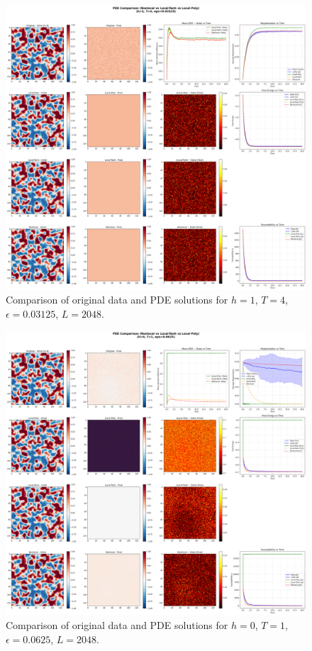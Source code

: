 \documentclass[11pt,a4paper]{article}
\begin{document}
\begin{figure}[h]
    \centering
    \includegraphics[width=1.0\textwidth]{fig/compare_pde_solvers_L2048_h1_T4_eps0.03125.png}
    \caption{Comparison of original data and PDE solutions for $h=1$, $T=4$, $\epsilon=0.03125$, $L=2048$.}
    \label{fig:pde_comparison_h1_T4_eps0.03125_L2048}
\end{figure}



\begin{figure}[!h]
    \centering
    \includegraphics[width=1.0\textwidth]{fig/compare_pde_solvers_L2048_h0_T1_eps0.0625.png}
    \caption{Comparison of original data and PDE solutions for $h=0$, $T=1$, $\epsilon=0.0625$, $L=2048$.}
    \label{fig:pde_comparison_h0_T1_eps0.0625_L2048}
\end{figure}
\end{document}
